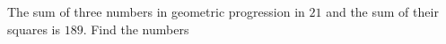 
%
%
%
%
% 
% 


\question[4] The sum of three numbers in geometric progression in $21$ and the sum of their
squares is $189$. Find the numbers


\ifprintanswers
\fi


